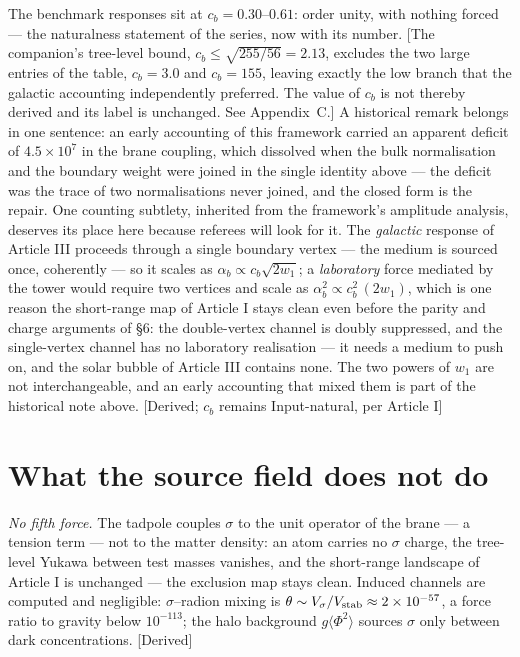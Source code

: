 The benchmark responses sit at $c_{b}=0.30$--$0.61$: order unity, with nothing forced --- the naturalness statement of the series, now with its number. [The companion's tree-level bound, $c_{b}\leq\sqrt{255/56}=2.13$, excludes the two large entries of the table, $c_{b}=3.0$ and $c_{b}=155$, leaving exactly the low branch that the galactic accounting independently preferred. The value of $c_{b}$ is not thereby derived and its label is unchanged. See Appendix~C.] A historical remark belongs in one sentence: an early accounting of this framework carried an apparent deficit of $4.5\times10^{7}$ in the brane coupling, which dissolved when the bulk normalisation and the boundary weight were joined in the single identity above --- the deficit was the trace of two normalisations never joined, and the closed form is the repair. One counting subtlety, inherited from the framework's amplitude analysis, deserves its place here because referees will look for it. The \emph{galactic} response of Article III proceeds through a single boundary vertex --- the medium is sourced once, coherently --- so it scales as $\alpha_{b}\propto c_{b}\sqrt{2w_{1}}$; a \emph{laboratory} force mediated by the tower would require two vertices and scale as $\alpha_{b}^{2}\propto c_{b}^{2}\,(2w_{1})$, which is one reason the short-range map of Article I stays clean even before the parity and charge arguments of \S6: the double-vertex channel is doubly suppressed, and the single-vertex channel has no laboratory realisation --- it needs a medium to push on, and the solar bubble of Article III contains none. The two powers of $w_{1}$ are not interchangeable, and an early accounting that mixed them is part of the historical note above. [Derived; $c_{b}$ remains Input-natural, per Article I]

\section{What the source field does not do}
\emph{No fifth force.} The tadpole couples $\sigma$ to the unit operator of the brane --- a tension term --- not to the matter density: an atom carries no $\sigma$ charge, the tree-level Yukawa between test masses vanishes, and the short-range landscape of Article I is unchanged --- the exclusion map stays clean. Induced channels are computed and negligible: $\sigma$--radion mixing is $\theta\sim V_{\sigma}/V_{\rm stab}\approx2\times10^{-57}$, a force ratio to gravity below $10^{-113}$; the halo background $g\langle\Phi^{2}\rangle$ sources $\sigma$ only between dark concentrations. [Derived]


